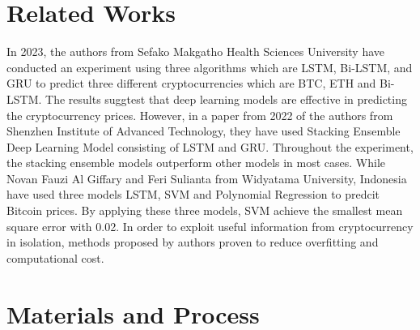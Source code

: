 \documentclass{ieeeojies}
\begin{document}
\section{Related Works}
In 2023, the authors \cite{seabe2023forecasting} from Sefako Makgatho Health Sciences University have conducted an experiment using three algorithms which are LSTM, Bi-LSTM, and GRU to predict three different cryptocurrencies which are BTC, ETH and Bi-LSTM. The results suggtest that deep learning models are effective in predicting the cryptocurrency prices. However, in a paper from 2022 of the authors \cite{ye2022stacking} from Shenzhen Institute of Advanced Technology, they have used Stacking Ensemble Deep Learning Model consisting of LSTM and GRU. Throughout the experiment, the stacking ensemble models outperform other models in most cases. While Novan Fauzi Al Giffary and Feri Sulianta \cite{fauzi2024prediction} from Widyatama University, Indonesia have used three models LSTM, SVM and Polynomial Regression to predcit Bitcoin prices. By applying these three models, SVM achieve the smallest mean square error with 0.02. In order to exploit useful information from cryptocurrency in isolation, methods proposed by  authors \cite{livieris2021advanced} proven to reduce overfitting and computational cost. 
\section{Materials and Process}
\end{document}
